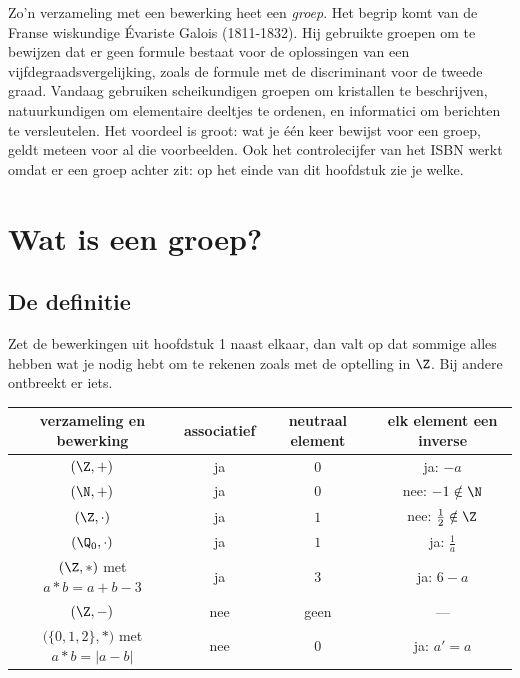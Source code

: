 Zo'n verzameling met een bewerking heet een \textit{groep}. Het begrip komt van de Franse wiskundige Évariste Galois (1811-1832). Hij gebruikte groepen om te bewijzen dat er geen formule bestaat voor de oplossingen van een vijfdegraadsvergelijking, zoals de formule met de discriminant voor de tweede graad. Vandaag gebruiken scheikundigen groepen om kristallen te beschrijven, natuurkundigen om elementaire deeltjes te ordenen, en informatici om berichten te versleutelen. Het voordeel is groot: wat je één keer bewijst voor een groep, geldt meteen voor al die voorbeelden. Ook het controlecijfer van het ISBN werkt omdat er een groep achter zit: op het einde van dit hoofdstuk zie je welke.

\begin{oefeningen}[Start]

\end{oefeningen}


\section{Wat is een groep?}

\subsection{De definitie}

Zet de bewerkingen uit hoofdstuk 1 naast elkaar, dan valt op dat sommige alles hebben wat je nodig hebt om te rekenen zoals met de optelling in $\Z$. Bij andere ontbreekt er iets.

\begin{center}
\renewcommand{\arraystretch}{1.3}
\begin{tabular}{|c|c|c|c|}
\hline
\rowcolor{accent!14} verzameling en bewerking & associatief & neutraal element & elk element een inverse \\ \hline
$(\Z, +)$ & ja & $0$ & ja: $-a$ \\ \hline
$(\N, +)$ & ja & $0$ & nee: $-1 \notin \N$ \\ \hline
$(\Z, \cdot)$ & ja & $1$ & nee: $\tfrac12 \notin \Z$ \\ \hline
$(\Q_0, \cdot)$ & ja & $1$ & ja: $\tfrac1a$ \\ \hline
$(\Z, \ast)$ met $a \ast b = a + b - 3$ & ja & $3$ & ja: $6 - a$ \\ \hline
$(\Z, -)$ & nee & geen & --- \\ \hline
$\bigl(\{0, 1, 2\}, \ast\bigr)$ met $a \ast b = |a - b|$ & nee & $0$ & ja: $a' = a$ \\ \hline
\end{tabular}
\end{center}

